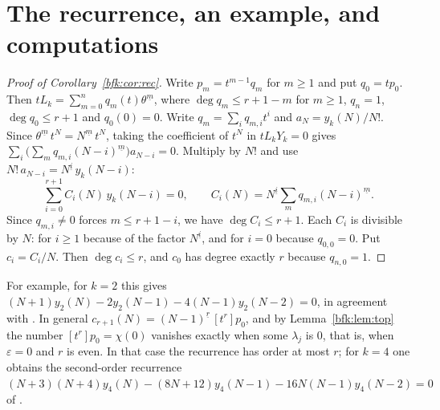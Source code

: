 \documentclass[11pt,a4paper]{article}
\theoremstyle{definition}
\theoremstyle{remark}
\numberwithin{equation}{section}
\newcommand{\ff}[2]{#1^{\underline{#2}}}
\begin{document}
\section{The recurrence, an example, and computations}\label{bfk:sec:rec}

\begin{proof}[Proof of Corollary~\ref{bfk:cor:rec}]
Write $p_m=t^{m-1}q_m$ for $m\ge1$ and put $q_0=tp_0$. Then $tL_k=\sum_{m=0}^nq_m(t)\ff\theta m$, where $\deg q_m\le r+1-m$ for $m\ge1$, $q_n=1$, $\deg q_0\le r+1$ and $q_0(0)=0$. Write $q_m=\sum_iq_{m,i}t^i$ and $a_N=y_k(N)/N!$. Since $\ff\theta m\,t^N=\ff Nm\,t^N$, taking the coefficient of $t^N$ in $tL_kY_k=0$ gives $\sum_i\bigl(\sum_mq_{m,i}\ff{(N-i)}m\bigr)a_{N-i}=0$. Multiply by $N!$ and use $N!\,a_{N-i}=\ff Ni\,y_k(N-i)$:
\[
\sum_{i=0}^{r+1}C_i(N)\,y_k(N-i)=0,\qquad C_i(N)=\ff Ni\sum_{m}q_{m,i}\ff{(N-i)}m .
\]
Since $q_{m,i}\ne0$ forces $m\le r+1-i$, we have $\deg C_i\le r+1$. Each $C_i$ is divisible by $N$: for $i\ge1$ because of the factor $\ff Ni$, and for $i=0$ because $q_{0,0}=0$. Put $c_i=C_i/N$. Then $\deg c_i\le r$, and $c_0$ has degree exactly $r$ because $q_{n,0}=1$.
\end{proof}

For example, for $k=2$ this gives $(N+1)y_2(N)-2y_2(N-1)-4(N-1)y_2(N-2)=0$, in agreement with \cite{BG00}. In general $c_{r+1}(N)=\ff{(N-1)}{r}\,[t^r]p_0$, and by Lemma~\ref{bfk:lem:top} the number $[t^r]p_0=\chi(0)$ vanishes exactly when some $\lambda_j$ is $0$, that is, when $\varepsilon=0$ and $r$ is even. In that case the recurrence has order at most $r$; for $k=4$ one obtains the second-order recurrence $(N+3)(N+4)y_4(N)-(8N+12)y_4(N-1)-16N(N-1)y_4(N-2)=0$ of \cite{BG00}.
\end{document}
